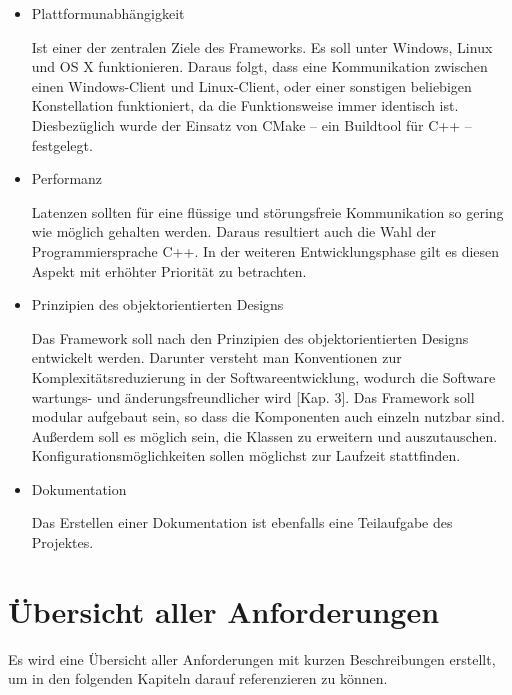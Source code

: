 \begin{itemize} 
\item Plattformunabhängigkeit

Ist einer der zentralen Ziele des Frameworks. Es soll unter Windows, Linux und OS X funktionieren. Daraus folgt, dass eine Kommunikation zwischen einen Windows-Client und Linux-Client, oder einer sonstigen beliebigen Konstellation funktioniert, da die Funktionsweise immer identisch ist. Diesbezüglich wurde der Einsatz von CMake -- ein Buildtool für C++ -- festgelegt.
		\pagebreak
\item Performanz

Latenzen sollten für eine flüssige und störungsfreie Kommunikation so gering wie möglich gehalten werden. Daraus resultiert auch die Wahl der Programmiersprache C++. In der weiteren Entwicklungsphase gilt es diesen Aspekt mit erhöhter Priorität zu betrachten.
		
\item Prinzipien des objektorientierten Designs

Das Framework soll nach den Prinzipien des objektorientierten Designs entwickelt werden. Darunter versteht man Konventionen zur Komplexitätsreduzierung in der Softwareentwicklung, wodurch die Software wartungs- und änderungsfreundlicher wird \cite{Lahres2009}[Kap. 3]. Das Framework soll modular aufgebaut sein, so dass die Komponenten auch einzeln nutzbar sind. Außerdem soll es möglich sein, die Klassen zu erweitern und auszutauschen. Konfigurationsmöglichkeiten sollen möglichst zur Laufzeit stattfinden. 
		
\item Dokumentation

Das Erstellen einer Dokumentation ist ebenfalls eine Teilaufgabe des Projektes.
		
\end{itemize}

\newpage
\section{Übersicht aller Anforderungen}
Es wird eine Übersicht aller Anforderungen mit kurzen Beschreibungen erstellt, um in den folgenden Kapiteln darauf referenzieren zu können.

